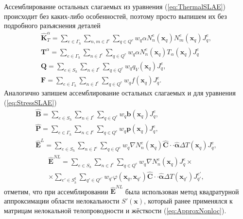 Ассемблирование остальных слагаемых из уравнения (\ref{eq:ThermalSLAE}) происходит без каких-либо особенностей, поэтому просто выпишем их без подробного разъяснения деталей
\begin{gather}
	\label{eq:HeatTransferMatrix}
	\widehat{\textbf{K}}^{\alpha}_T =
	\sum\limits_{e \in \Gamma_h}
	\sum\limits_{n,m \in I^{e}}
	\sum\limits_{q \in Q^e}
	w_q \alpha N_n^e (\boldsymbol{x}_q) N_m^e (\boldsymbol{x}_q) J_q^e,
	\\
	\label{eq:HeatTransferVector}
	\textbf{T}^{\alpha} =
	\sum\limits_{e \in \Gamma_h}
	\sum\limits_{n \in I^{e}}
	\sum\limits_{q \in Q^e}
	w_q \alpha N_n^e (\boldsymbol{x}_q) T_{\alpha} (\boldsymbol{x}_q) J_q^e
	\\
	\label{eq:InnerFlux}
	\textbf{Q} =
	\sum\limits_{e \in S_h}
	\sum\limits_{n \in I^e}
	\sum\limits_{q \in Q^e}
	w_q q_V (\boldsymbol{x}_q) J_q^e,
	\\
	\label{eq:OuterFlux}
	\textbf{F} =
	\sum\limits_{e \in \Gamma_h}
	\sum\limits_{n \in I^e}
	\sum\limits_{q \in Q^e}
	w_q f (\boldsymbol{x}_q) J_q^e.
\end{gather}
Аналогично запишем ассемблирование остальных слагаемых и для уравнения (\ref{eq:StressSLAE})
\begin{gather}
	\label{eq:InnerPressure}
	\widehat{\textbf{B}} =
	\sum\limits_{e \in S_h}
	\sum\limits_{n \in I^e}
	\sum\limits_{q \in Q^e}
	w_q \boldsymbol{b} (\boldsymbol{x}_q) J_q^e,
	\\
	\label{eq:OuterPressure}
	\widehat{\textbf{P}} = 
	\sum\limits_{e \in \Gamma_h}
	\sum\limits_{n \in I^e}
	\sum\limits_{q \in Q^e}
	w_q \boldsymbol{p} (\boldsymbol{x}_q) J_q^e,
	\\
	\label{eq:LocalThermalExpansion}
	\widehat{\textbf{E}}^L = 
	\sum\limits_{e \in S_h}
	\sum\limits_{n \in I^e}
	\sum\limits_{q \in Q^e}
	w_q \nabla N_n^e (\boldsymbol{x}_q) \widehat{\mathbf{C}} \cdot \cdot \widehat{\boldsymbol{\alpha}} \Delta T (\boldsymbol{x}_q) J_q^e,
\end{gather}
\begin{multline}
	\label{eq:NonLocalThermalExpansion}
	\widehat{\textbf{E}}^{NL} = 
	\sum\limits_{e \in S_h}
	\sum\limits_{n \in I^e}
	\sum\limits_{q \in Q^e}
	w_q \nabla N_n^e (\boldsymbol{x}_q) J_q^e 
	\times \\ \times
	\sum\limits_{e' \in S_h^q}
	\sum\limits_{q' \in Q^{e'}}
	w_{q'} \varphi (\boldsymbol{x}_q, \boldsymbol{x}_{q'}) \widehat{\mathbf{C}} \cdot \cdot \widehat{\boldsymbol{\alpha}} \Delta T (\boldsymbol{x}_{q'}) J_{q'}^{e'},
\end{multline}
отметим, что при ассемблировании $\widehat{\textbf{E}}^{NL}$ была использован метод квадратурной аппроксимации области нелокальности $S'(\boldsymbol{x})$, который ранее применялся к матрицам нелокальной телопроводности и жёсткости (\ref{eq:ApproxNonloc}).

